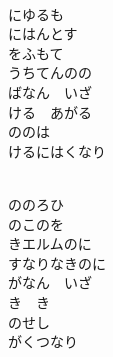 \documentclass[10pt,b5j]{tarticle} %
\begin{document}
\begin{enumerate}
\begin{minipage}[c]{\blocksize}
        \vspace{\linespace}
        \item~\\
        にゆるも\\
        にはんとす\\
        をふもて\\
        うちてんのの\\
        ばなん　いざ\\
        ける　あがる\\
        ののは\\
        けるにはくなり
        
        \vspace{\linespace}
        \item~\\
        ののろひ\\
        のこのを\\
        きエルムのに\\
        すなりなきのに\\
        がなん　いざ\\
        き　き\\
        のせし\\
        がくつなり
    
    \end{minipage}
\end{enumerate} %
\end{document}
